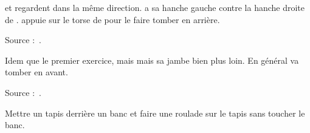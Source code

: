 \begin{exercice}
\A et \D regardent dans la même direction.
\A a sa hanche gauche contre la hanche droite de \D.
\A appuie sur le torse de \D pour le faire tomber en arrière.

Source :~\cite{petit:dijon:close_longword:2015}.
\end{exercice}


\begin{exercice}
Idem que le premier exercice, mais \A mais sa jambe bien plus loin.
En général \D va tomber en avant.

Source :~\cite{petit:dijon:close_longword:2015}.
\end{exercice}


\begin{exercice}
Mettre un tapis derrière un banc et faire une roulade sur le tapis sans toucher le banc.
\end{exercice}

